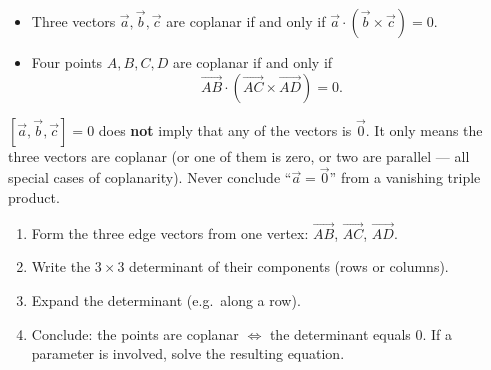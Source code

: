 \documentclass[11pt]{article}
\begin{document}
\begin{propriete}
\begin{itemize}
\item Three vectors $\vec{a}, \vec{b}, \vec{c}$ are coplanar if and only if $\vec{a} \cdot (\vec{b} \times \vec{c}) = 0$.
\item Four points $A, B, C, D$ are coplanar if and only if
\[
\overrightarrow{AB} \cdot \left( \overrightarrow{AC} \times \overrightarrow{AD} \right) = 0.
\]
\end{itemize}
\end{propriete}

\begin{attention}
$[\vec{a}, \vec{b}, \vec{c}] = 0$ does \textbf{not} imply that any of the vectors is $\vec{0}$. It only means the three vectors are coplanar (or one of them is zero, or two are parallel --- all special cases of coplanarity). Never conclude ``$\vec{a} = \vec{0}$'' from a vanishing triple product.
\end{attention}

\begin{methode}
\begin{enumerate}
\item Form the three edge vectors from one vertex: $\overrightarrow{AB}$, $\overrightarrow{AC}$, $\overrightarrow{AD}$.
\item Write the $3\times 3$ determinant of their components (rows or columns).
\item Expand the determinant (e.g.\ along a row).
\item Conclude: the points are coplanar $\iff$ the determinant equals $0$. If a parameter is involved, solve the resulting equation.
\end{enumerate}
\end{methode}
\end{document}
